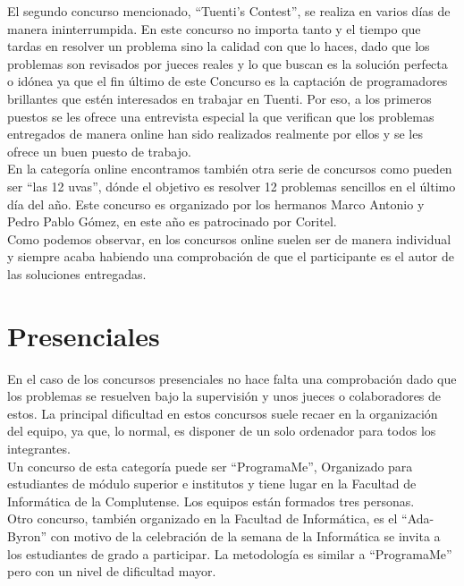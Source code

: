 El segundo concurso mencionado, ``Tuenti's Contest'', se realiza en
varios días de manera ininterrumpida. En este concurso no importa
tanto y el tiempo que tardas en resolver un problema sino la calidad
con que lo haces, dado que los problemas son revisados por jueces
reales y lo que buscan es la solución perfecta o idónea ya que el fin
último de este Concurso es la captación de programadores brillantes
que estén interesados en trabajar en Tuenti. Por eso, a los primeros
puestos se les ofrece una entrevista especial la que verifican que los
problemas entregados de manera online han sido realizados realmente
por ellos y se les ofrece un buen puesto de trabajo.
\\

En la categoría online encontramos también otra serie de concursos
como pueden ser ``las 12 uvas'', dónde el objetivo es resolver 12
problemas sencillos en el último día del año. Este concurso es
organizado por los hermanos Marco Antonio y Pedro Pablo Gómez, en este
año es patrocinado por Coritel.
\\

Como podemos observar, en los concursos online suelen ser de manera
individual y siempre acaba habiendo una comprobación de que el
participante es el autor de las soluciones entregadas.

\section{Presenciales}
\label{sec:concursos:presenciales}

En el caso de los concursos presenciales no hace falta una
comprobación dado que los problemas se resuelven bajo la supervisión y
unos jueces o colaboradores de estos. La principal dificultad en estos
concursos suele recaer en la organización del equipo, ya que, lo
normal, es disponer de un solo ordenador para todos los integrantes.\\

Un concurso de esta categoría puede ser ``ProgramaMe'', Organizado para
estudiantes de módulo superior e institutos y tiene lugar en la
Facultad de Informática de la Complutense. Los equipos están formados
tres personas.\\

Otro concurso, también organizado en la Facultad de Informática, es el
``Ada-Byron'' con motivo de la celebración de la semana de la
Informática se invita a los estudiantes de grado a participar. La
metodología es similar a ``ProgramaMe'' pero con un nivel de dificultad
mayor.\\

